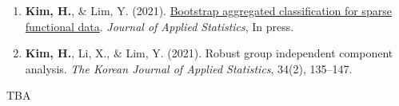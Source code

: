 \documentclass[11pt, a4paper]{awesome-cv} %
\begin{document}

\begin{cventries}
	\begin{enumerate}
		\item {\bf Kim, H.}, \& Lim, Y. (2021). \href{https://doi.org/10.1080/02664763.2021.1889997}{Bootstrap aggregated classification for sparse functional data}. {\em Journal of Applied Statistics}, In press.
		\item {\bf Kim, H.}, Li, X., \& Lim, Y. (2021). Robust group independent component analysis. {\em The Korean Journal of Applied Statistics}, 34(2), 135–147.
	\end{enumerate}
\end{cventries}



TBA
%	


\end{document}
